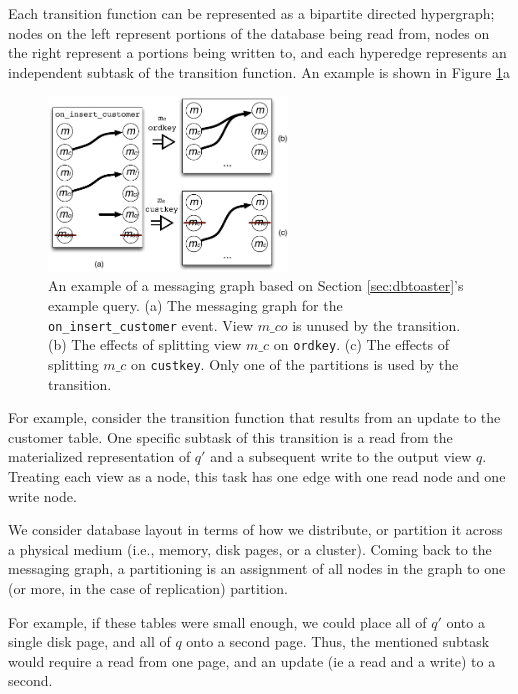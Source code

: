Each transition function can be represented as a bipartite directed hypergraph; nodes on the left represent portions of the database being read from, nodes on the right represent a portions being written to, and each hyperedge represents an independent subtask of the transition function.  An example is shown in Figure \ref{fig:diag:messagingGraph}a

\begin{figure}
\begin{center}
\includegraphics[width=2.5in]{graphics/MessagingGraph}
\end{center}
\caption{An example of a messaging graph based on Section \ref{sec:dbtoaster}'s example query.  (a) The messaging graph for the \texttt{on\_insert\_customer} event.  View $m\_co$ is unused by the transition.  (b) The effects of splitting view $m\_c$ on \texttt{ordkey}.  (c) The effects of splitting $m\_c$ on \texttt{custkey}.  Only one of the partitions is used by the transition.}
\label{fig:diag:messagingGraph}
\end{figure}

For example, consider the transition function that results from an update to the customer table.  One specific subtask of this transition is a read from the materialized representation of $q'$ and a subsequent write to the output view $q$.  Treating each view as a node, this task has one edge with one read node and one write node.  

We consider database layout in terms of how we distribute, or partition it across a physical medium (i.e., memory, disk pages, or a cluster).  Coming back to the messaging graph, a partitioning is an assignment of all nodes in the graph to one (or more, in the case of replication) partition.  

For example, if these tables were small enough, we could place all of $q'$ onto a single disk page, and all of $q$ onto a second page.  Thus, the mentioned subtask would require a read from one page, and an update (ie a read and a write) to a second.  

